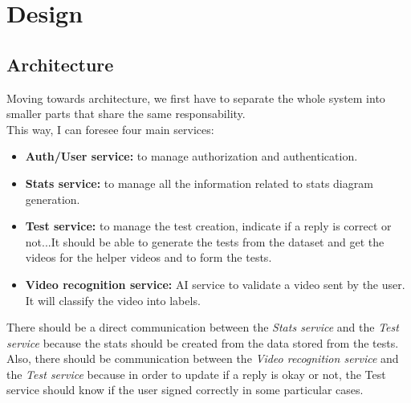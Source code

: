 \chapter{Design}

\section{Architecture}
Moving towards architecture, we first have to separate the whole system into smaller parts that share the same responsability. \\
This way, I can foresee four main services:
\begin{itemize}[noitemsep]
    \item \textbf{Auth/User service:} to manage authorization and authentication.
    \item \textbf{Stats service:} to manage all the information related to stats diagram generation. 
    \item \textbf{Test service:} to manage the test creation, indicate if a reply is correct or not...It should be able to generate the tests from the dataset and get the videos for the helper videos and to form the tests.
    \item \textbf{Video recognition service:} AI service to validate a video sent by the user. It will classify the video into labels.
\end{itemize}

There should be a direct communication between the \textit{Stats service} and the \textit{Test service} because the stats should be created from the data stored from the tests. \\
Also, there should be communication between the \textit{Video recognition service} and the \textit{Test service} because in order to update if a reply is okay or not, the {Test service} should know if the user signed correctly in some particular cases.

